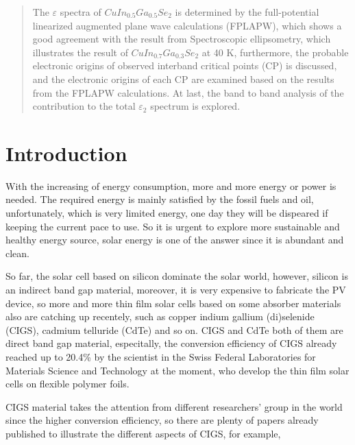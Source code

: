 \documentclass[a4paper]{report}
\begin{document}
\begin{abstract}
\noindent The $\varepsilon$ spectra of $CuIn_{0.5}Ga_{0.5}Se_2$ is determined by the full-potential linearized augmented plane wave calculations (FPLAPW), which shows a good 
agreement with the result from Spectroscopic ellipsometry, which illustrates the result of $CuIn_{0.7}Ga_{0.3}Se_2$ at 40 K, furthermore, the probable electronic origins of 
observed interband critical points (CP) is discussed, and the electronic origins of each CP are examined based on the results from the FPLAPW calculations. At 
last, the band to band analysis of the contribution to the total ${\varepsilon_2}$ spectrum is explored.
\end{abstract}


\chapter{Introduction }
With the increasing of energy consumption, more and more energy or power is needed. The required energy is mainly satisfied by the fossil fuels and oil, unfortunately,
which is very limited energy, one day they will be dispeared if keeping the current pace to use. So it is urgent to explore more sustainable and healthy energy source,
solar energy is one of the answer since it is abundant and clean. 

So far, the solar cell based on silicon dominate the solar world, however, silicon is an indirect band gap material, moreover, it is very expensive to fabricate the PV device,
so more and more thin film solar cells based on some absorber materials also are catching up recentely, such as copper indium gallium (di)selenide (CIGS), cadmium telluride (CdTe) and so on. 
CIGS and CdTe both of them are direct band gap material, especitally, the conversion efficiency of CIGS already reached up to 20.4\% by the scientist in the Swiss Federal Laboratories for Materials Science and Technology at the moment, who develop the thin film solar cells on flexible polymer foils.

CIGS material takes the attention from different researchers' group in the world since the higher conversion efficiency, so there are plenty of papers already published to 
illustrate the different aspects of CIGS, for example,
\end{document}
